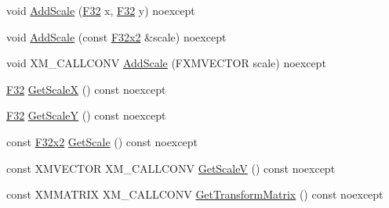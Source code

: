 \begin{DoxyCompactItemize}
\item 
void \mbox{\hyperlink{classmage_1_1_texture_transform_a460f9fb43a5b6390d54ab72425a39ceb}{Add\+Scale}} (\mbox{\hyperlink{namespacemage_aa97e833b45f06d60a0a9c4fc22ae02c0}{F32}} x, \mbox{\hyperlink{namespacemage_aa97e833b45f06d60a0a9c4fc22ae02c0}{F32}} y) noexcept
\item 
void \mbox{\hyperlink{classmage_1_1_texture_transform_aafb4f17f7892edc4569757f873037ddd}{Add\+Scale}} (const \mbox{\hyperlink{namespacemage_aee4759dedc8def6c6dec26b5c7eddf29}{F32x2}} \&scale) noexcept
\item 
void X\+M\+\_\+\+C\+A\+L\+L\+C\+O\+NV \mbox{\hyperlink{classmage_1_1_texture_transform_a6fa7617e33c123fd09b9f1c7e06afaa1}{Add\+Scale}} (F\+X\+M\+V\+E\+C\+T\+OR scale) noexcept
\item 
\mbox{\hyperlink{namespacemage_aa97e833b45f06d60a0a9c4fc22ae02c0}{F32}} \mbox{\hyperlink{classmage_1_1_texture_transform_a8aba9997f667007fb9b77e14031a1f00}{Get\+ScaleX}} () const noexcept
\item 
\mbox{\hyperlink{namespacemage_aa97e833b45f06d60a0a9c4fc22ae02c0}{F32}} \mbox{\hyperlink{classmage_1_1_texture_transform_a06a3314cef041f0070f7203e1538a2eb}{Get\+ScaleY}} () const noexcept
\item 
const \mbox{\hyperlink{namespacemage_aee4759dedc8def6c6dec26b5c7eddf29}{F32x2}} \mbox{\hyperlink{classmage_1_1_texture_transform_a822d0aac9ada61b2e8df0949b28fbff1}{Get\+Scale}} () const noexcept
\item 
const X\+M\+V\+E\+C\+T\+OR X\+M\+\_\+\+C\+A\+L\+L\+C\+O\+NV \mbox{\hyperlink{classmage_1_1_texture_transform_af8290a3e9db59677b9f2f217b464d625}{Get\+ScaleV}} () const noexcept
\item 
const X\+M\+M\+A\+T\+R\+IX X\+M\+\_\+\+C\+A\+L\+L\+C\+O\+NV \mbox{\hyperlink{classmage_1_1_texture_transform_a8463a5d1060614cd3a8847b527094fc0}{Get\+Transform\+Matrix}} () const noexcept
\end{DoxyCompactItemize}
